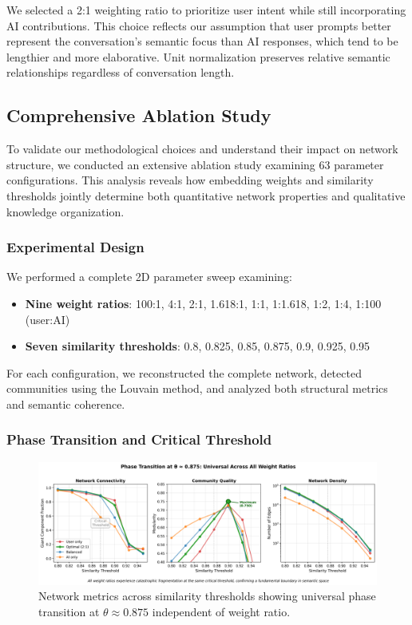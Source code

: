 \documentclass{svproc}
\begin{document}
We selected a 2:1 weighting ratio to prioritize user intent while still incorporating AI contributions. This choice reflects our assumption that user prompts better represent the conversation's semantic focus than AI responses, which tend to be lengthier and more elaborative. Unit normalization preserves relative semantic relationships regardless of conversation length.


\subsection{Comprehensive Ablation Study}

To validate our methodological choices and understand their impact on network structure, we conducted an extensive ablation study examining 63 parameter configurations. This analysis reveals how embedding weights and similarity thresholds jointly determine both quantitative network properties and qualitative knowledge organization.

\subsubsection{Experimental Design}

We performed a complete 2D parameter sweep examining:
\begin{itemize}
    \item \textbf{Nine weight ratios}: 100:1, 4:1, 2:1, 1.618:1, 1:1, 1:1.618, 1:2, 1:4, 1:100 (user:AI)
    \item \textbf{Seven similarity thresholds}: 0.8, 0.825, 0.85, 0.875, 0.9, 0.925, 0.95
\end{itemize}

For each configuration, we reconstructed the complete network, detected communities using the Louvain method, and analyzed both structural metrics and semantic coherence.

\subsubsection{Phase Transition and Critical Threshold}

\begin{figure}[h]
\centering
\includegraphics[width=\textwidth]{./images/threshold_evolution_clean.png}
\caption{Network metrics across similarity thresholds showing universal phase transition at $\theta \approx 0.875$ independent of weight ratio.}
\label{fig:phase_transition}
\end{figure}
\end{document}
